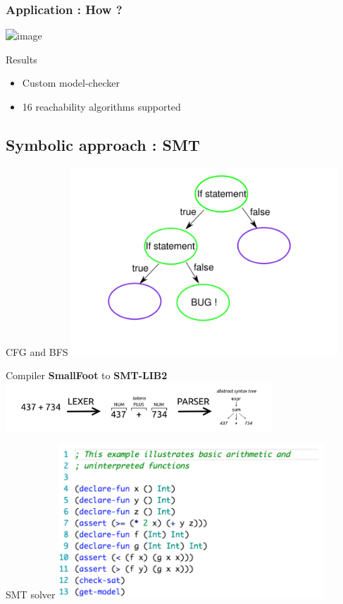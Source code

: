 \documentclass{beamer}
\begin{document}
\begin{frame}
    \frametitle{Application : How ? }

    \includegraphics<2>[width=\textwidth]{Figures/slide_mc.png}

    \begin{block}{Results}
        \begin{itemize}
            \item Custom model-checker
            \item 16 reachability algorithms supported
        \end{itemize}
    \end{block}

\end{frame}





\subsection{Symbolic approach : SMT }
\begin{frame}{CFG and BFS}
    \includegraphics[width=10cm]{Figures/SMTsolver/CFG.png}

\end{frame}

\begin{frame}{Compiler}
\textbf{SmallFoot} to \textbf{SMT-LIB2}
\includegraphics[width=10cm]{Figures/SMTsolver/Image_PARSER_LEXER.png}

\end{frame}

\begin{frame}{SMT solver}
\includegraphics[width=10cm]{Figures/SMTsolver/SAT_SMTLIB.png}
\end{frame}
\end{document}
